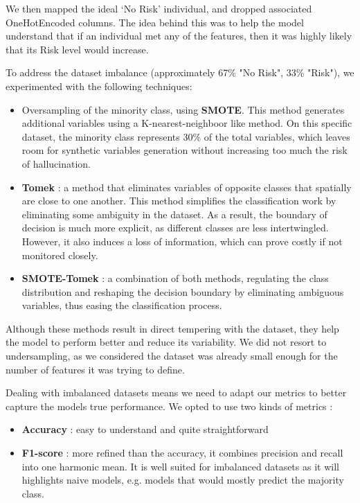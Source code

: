 \documentclass[12pt]{report}
\begin{document}
We then mapped the ideal ‘No Risk’ individual, and dropped associated OneHotEncoded columns. The idea behind this was to help the model understand that if an individual met any of the features, then it was highly likely that its Risk level would increase.

To address the dataset imbalance (approximately 67\% "No Risk", 33\% "Risk"), we experimented with the following techniques:
\begin{itemize}
    \item Oversampling of the minority class, using \textbf{SMOTE}. This method generates additional variables using a K-nearest-neighboor like method. On this specific dataset, the minority class represents 30\% of the total variables, which leaves room for synthetic variables generation without increasing too much the risk of hallucination.
    \item \textbf{Tomek} : a method that eliminates variables of opposite classes that spatially are close to one another. This method simplifies the classification work by eliminating some ambiguity in the dataset. As a result, the boundary of decision is much more explicit, as different classes are less intertwingled. However, it also induces a loss of information, which can prove costly if not monitored closely.
    \item \textbf{SMOTE-Tomek} : a combination of both methods, regulating the class distribution and reshaping the decision boundary by eliminating ambiguous variables, thus easing the classification process. 
\end{itemize}

Although these methods result in direct tempering with the dataset, they help the model to perform better and reduce its variability. We did not resort to undersampling, as we considered the dataset was already small enough for the number of features it was trying to define.

Dealing with imbalanced datasets means we need to adapt our metrics to better capture the models true performance. We opted to use two kinds of metrics :
\begin{itemize}
    \item \textbf{Accuracy} : easy to understand and quite straightforward
    \item \textbf{F1-score} : more refined than the accuracy, it combines precision and recall into one harmonic mean. It is well suited for imbalanced datasets as it will highlights naive models, e.g. models that would mostly predict the majority class.
\end{itemize}
\end{document}
